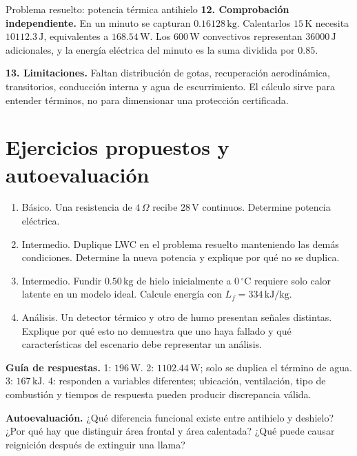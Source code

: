 \begin{studiumworked}{Problema resuelto: potencia térmica antihielo}
\textbf{12. Comprobación independiente.} En un minuto se capturan $0.16128\,\mathrm{kg}$. Calentarlos $15\,\mathrm{K}$ necesita $10112.3\,\mathrm{J}$, equivalentes a $168.54\,\mathrm{W}$. Los $600\,\mathrm{W}$ convectivos representan $36000\,\mathrm{J}$ adicionales, y la energía eléctrica del minuto es la suma dividida por $0.85$.

\textbf{13. Limitaciones.} Faltan distribución de gotas, recuperación aerodinámica, transitorios, conducción interna y agua de escurrimiento. El cálculo sirve para entender términos, no para dimensionar una protección certificada.


\end{studiumworked}

\section{Ejercicios propuestos y autoevaluación}
\begin{enumerate}
\item Básico. Una resistencia de $4\,\Omega$ recibe $28\,\mathrm{V}$ continuos. Determine potencia eléctrica.
\item Intermedio. Duplique LWC en el problema resuelto manteniendo las demás condiciones. Determine la nueva potencia y explique por qué no se duplica.
\item Intermedio. Fundir $0.50\,\mathrm{kg}$ de hielo inicialmente a $0\,{}^\circ\mathrm{C}$ requiere solo calor latente en un modelo ideal. Calcule energía con $L_f=334\,\mathrm{kJ/kg}$.
\item Análisis. Un detector térmico y otro de humo presentan señales distintas. Explique por qué esto no demuestra que uno haya fallado y qué características del escenario debe representar un análisis.
\end{enumerate}
\textbf{Guía de respuestas.} 1: $196\,\mathrm{W}$. 2: $1102.44\,\mathrm{W}$; solo se duplica el término de agua. 3: $167\,\mathrm{kJ}$. 4: responden a variables diferentes; ubicación, ventilación, tipo de combustión y tiempos de respuesta pueden producir discrepancia válida.

\textbf{Autoevaluación.} ¿Qué diferencia funcional existe entre antihielo y deshielo? ¿Por qué hay que distinguir área frontal y área calentada? ¿Qué puede causar reignición después de extinguir una llama?


\studiumchaptercheck
